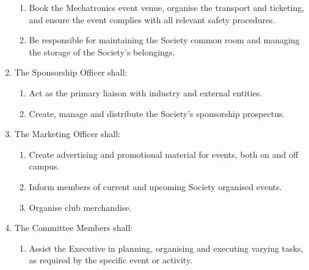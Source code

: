 \documentclass[11pt]{article}
\begin{document}
\begin{enumerate}[\thesection .1]
\begin{enumerate}
        \item Book the Mechatronics event venue, organise the transport and ticketing, and ensure the event complies with all relevant safety procedures.
        \item Be responsible for maintaining the Society common room and managing the storage of the Society's belongings.
    \end{enumerate}
    \item The Sponsorship Officer shall:
    \begin{enumerate}
        \item Act as the primary liaison with industry and external entities.
        \item Create, manage and distribute the Society's sponsorship prospectus.
    \end{enumerate}
    \item The Marketing Officer shall:
    \begin{enumerate}
        \item Create advertising and promotional material for events, both on and off campus.
        \item Inform members of current and upcoming Society organised events.
        \item Organise club merchandise.
    \end{enumerate}
    \item The Committee Members shall:
    \begin{enumerate}
        \item Assist the Executive in planning, organising and executing varying tasks, as required by the specific event or activity.
    \end{enumerate}
\end{enumerate}
\end{document}
